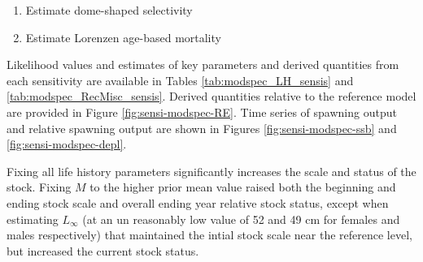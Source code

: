 \documentclass[11pt,
  english,
  a4paper,
]{article}
\begin{document}
\begin{itemize}
\begin{enumerate}
    \tagmcend\tagstructend\tagstructend

    \tagmcend\tagstructend\tagstructend
  \item


    Estimate dome-shaped selectivity

    \tagmcend\tagstructend\tagstructend

    \tagmcend\tagstructend\tagstructend
  \item


    Estimate Lorenzen age-based mortality

    \tagmcend\tagstructend\tagstructend

    \tagmcend\tagstructend\tagstructend
  \end{enumerate}

  \tagstructend
\end{itemize}

\tagstructend


Likelihood values and estimates of key parameters and derived quantities from each sensitivity are available in Tables \ref{tab:modspec_LH_sensis} and \ref{tab:modspec_RecMisc_sensis}. Derived quantities relative to the reference model are provided in Figure \ref{fig:sensi-modspec-RE}. Time series of spawning output and relative spawning output are shown in Figures \ref{fig:sensi-modspec-ssb} and \ref{fig:sensi-modspec-depl}.

\leavevmode\tagmcend\tagstructend\par


Fixing all life history parameters significantly increases the scale and status of the stock. Fixing {\(M\)\leavevmode\tagmcend\tagstructend} to the higher prior mean value raised both the beginning and ending stock scale and overall ending year relative stock status, except when estimating {\(L_{\infty}\)\leavevmode\tagmcend\tagstructend} (at an un reasonably low value of 52 and 49 cm for females and males respectively) that maintained the intial stock scale near the reference level, but increased the current stock status.
\end{document}
